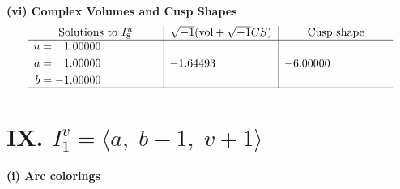 \documentclass[1p]{elsarticle_modified}
\theoremstyle{definition}
\newcommand{\I}{\sqrt{-1}}
\begin{document}
\newpage\flushleft \textbf{(vi) Complex Volumes and Cusp Shapes}
$$\begin{array}{c|c|c}  
\text{Solutions to }I^u_{8}& \I (\text{vol} + \sqrt{-1}CS) & \text{Cusp shape}\\
 \hline 
\begin{aligned}
u &= \phantom{-}1.00000\phantom{ +0.000000I} \\
a &= \phantom{-}1.00000\phantom{ +0.000000I} \\
b &= -1.00000\phantom{ +0.000000I}\end{aligned}
 & -1.64493\phantom{ +0.000000I} & -6.00000\phantom{ +0.000000I}\\
 \hline 
 \end{array}$$\newpage\newpage\renewcommand{\arraystretch}{1}
\centering \section*{IX. $I^v_{1}= \langle a,\;b-1,\;v+1 \rangle$}
\flushleft \textbf{(i) Arc colorings}\\
\end{document}
